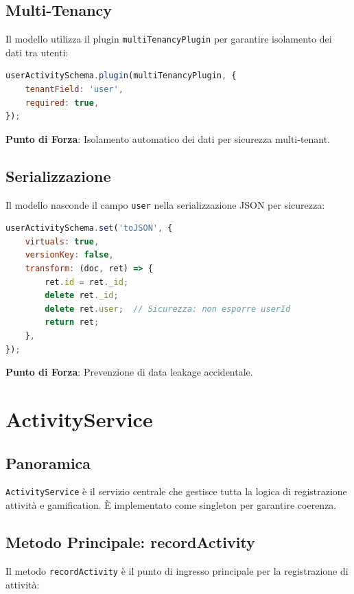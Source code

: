 \documentclass[11pt,a4paper]{article}
\begin{document}
\subsection{Multi-Tenancy}

Il modello utilizza il plugin \texttt{multiTenancyPlugin} per garantire isolamento dei dati tra utenti:

\begin{lstlisting}[language=JavaScript]
userActivitySchema.plugin(multiTenancyPlugin, {
    tenantField: 'user',
    required: true,
});
\end{lstlisting}

\textbf{Punto di Forza}: Isolamento automatico dei dati per sicurezza multi-tenant.

\subsection{Serializzazione}

Il modello nasconde il campo \texttt{user} nella serializzazione JSON per sicurezza:

\begin{lstlisting}[language=JavaScript]
userActivitySchema.set('toJSON', {
    virtuals: true,
    versionKey: false,
    transform: (doc, ret) => {
        ret.id = ret._id;
        delete ret._id;
        delete ret.user;  // Sicurezza: non esporre userId
        return ret;
    },
});
\end{lstlisting}

\textbf{Punto di Forza}: Prevenzione di data leakage accidentale.

\section{ActivityService}

\subsection{Panoramica}

\texttt{ActivityService} è il servizio centrale che gestisce tutta la logica di registrazione attività e gamification. È implementato come singleton per garantire coerenza.

\subsection{Metodo Principale: recordActivity}

Il metodo \texttt{recordActivity} è il punto di ingresso principale per la registrazione di attività:
\end{document}
